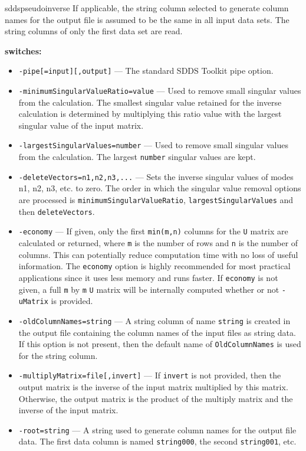 \begin{sddsprog}{sddspseudoinverse}
    If applicable, the string column selected to generate column names for the output file is assumed to be the same in all input data sets. The string columns of only the first data set are read.

  \item \textbf{switches:}
    \begin{itemize}
      \item \verb|-pipe[=input][,output]| --- The standard SDDS Toolkit pipe option.
      \item \verb|-minimumSingularValueRatio=value| --- Used to remove small singular values from the calculation. The smallest singular value retained for the inverse calculation is determined by multiplying this ratio value with the largest singular value of the input matrix.
      \item \verb|-largestSingularValues=number| --- Used to remove small singular values from the calculation. The largest \verb|number| singular values are kept.
      \item \verb|-deleteVectors=n1,n2,n3,...| --- Sets the inverse singular values of modes n1, n2, n3, etc. to zero. The order in which the singular value removal options are processed is \verb|minimumSingularValueRatio|, \verb|largestSingularValues| and then \verb|deleteVectors|.
      \item \verb|-economy| --- If given, only the first \verb|min(m,n)| columns for the \verb|U| matrix are calculated or returned, where \verb|m| is the number of rows and \verb|n| is the number of columns. This can potentially reduce computation time with no loss of useful information. The \verb|economy| option is highly recommended for most practical applications since it uses less memory and runs faster. If \verb|economy| is not given, a full \verb|m| by \verb|m| \verb|U| matrix will be internally computed whether or not \verb|-uMatrix| is provided.
      \item \verb|-oldColumnNames=string| --- A string column of name {\tt string} is created in the output file containing the column names of the input files as string data. If this option is not present, then the default name of \verb|OldColumnNames| is used for the string column.
      \item \verb|-multiplyMatrix=file[,invert]| --- If \verb|invert| is not provided, then the output matrix is the inverse of the input matrix multiplied by this matrix. Otherwise, the output matrix is the product of the multiply matrix and the inverse of the input matrix.
      \item \verb|-root=string| --- A string used to generate column names for the output file data. The first data column is named \verb|string000|, the second \verb|string001|, etc.

\end{itemize}
\end{sddsprog}
